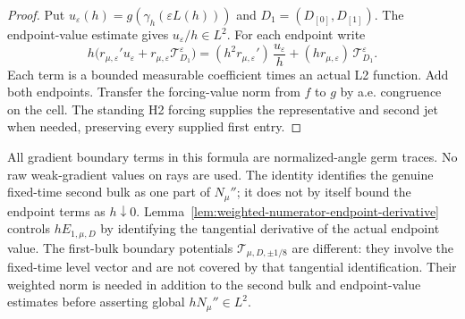 \begin{proof}
\leanok
Put $u_\varepsilon(h)=g(\gamma_h(\varepsilon L(h)))$ and
$D_1=(D_{[0]},D_{[1]})$. The endpoint-value estimate gives $u_\varepsilon/h\in L^2$.
For each endpoint write
\[
 h\bigl(r_{\mu,\varepsilon}'u_\varepsilon
       +r_{\mu,\varepsilon}\mathscr T_{D_1}^\varepsilon\bigr)
 = (h^2r_{\mu,\varepsilon}')\,\frac{u_\varepsilon}h
       +(hr_{\mu,\varepsilon})\,\mathscr T_{D_1}^\varepsilon .
\]
Each term is a bounded measurable coefficient times an actual L2 function.
Add both endpoints. Transfer the forcing-value norm from $f$ to $g$ by a.e.
congruence on the cell. The standing H2 forcing supplies the representative
and second jet when needed, preserving every supplied first entry.
\end{proof}

\begin{remark}
All gradient boundary terms in this formula are normalized-angle germ traces.
No raw weak-gradient values on rays are used.
The identity identifies the genuine fixed-time second bulk as one part of
$N_\mu''$; it does not by itself bound the endpoint terms as $h\downarrow0$.
Lemma~\ref{lem:weighted-numerator-endpoint-derivative} controls $hE_{1,\mu,D}$
by identifying the tangential derivative of the actual endpoint value.
The first-bulk boundary potentials $\mathcal T_{\mu,D,\pm1/8}$ are different:
they involve the fixed-time level vector and are not covered by that tangential
identification. Their weighted norm is needed in addition to the second bulk
and endpoint-value estimates before asserting global $hN_\mu''\in L^2$.
\end{remark}

